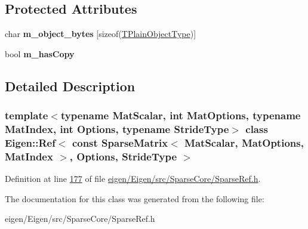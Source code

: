 \subsection*{Protected Attributes}
\begin{DoxyCompactItemize}
\item 
\mbox{\label{class_eigen_1_1_ref_3_01const_01_sparse_matrix_3_01_mat_scalar_00_01_mat_options_00_01_mat_index1bbfd78857ba9c14d54178cb3009ac38_a1573ab768643c2c0a3c5fd85b867f0eb}} 
char {\bfseries m\+\_\+object\+\_\+bytes} \mbox{[}sizeof(\hyperlink{group___sparse_core___module_class_eigen_1_1_sparse_matrix}{T\+Plain\+Object\+Type})\mbox{]}
\item 
\mbox{\label{class_eigen_1_1_ref_3_01const_01_sparse_matrix_3_01_mat_scalar_00_01_mat_options_00_01_mat_index1bbfd78857ba9c14d54178cb3009ac38_abec17deb79f1e51209e9df1b2f421d9b}} 
bool {\bfseries m\+\_\+has\+Copy}
\end{DoxyCompactItemize}


\subsection{Detailed Description}
\subsubsection*{template$<$typename Mat\+Scalar, int Mat\+Options, typename Mat\+Index, int Options, typename Stride\+Type$>$\newline
class Eigen\+::\+Ref$<$ const Sparse\+Matrix$<$ Mat\+Scalar, Mat\+Options, Mat\+Index $>$, Options, Stride\+Type $>$}



Definition at line \hyperlink{eigen_2_eigen_2src_2_sparse_core_2_sparse_ref_8h_source_l00177}{177} of file \hyperlink{eigen_2_eigen_2src_2_sparse_core_2_sparse_ref_8h_source}{eigen/\+Eigen/src/\+Sparse\+Core/\+Sparse\+Ref.\+h}.



The documentation for this class was generated from the following file\+:\begin{DoxyCompactItemize}
\item 
eigen/\+Eigen/src/\+Sparse\+Core/\+Sparse\+Ref.\+h\end{DoxyCompactItemize}
